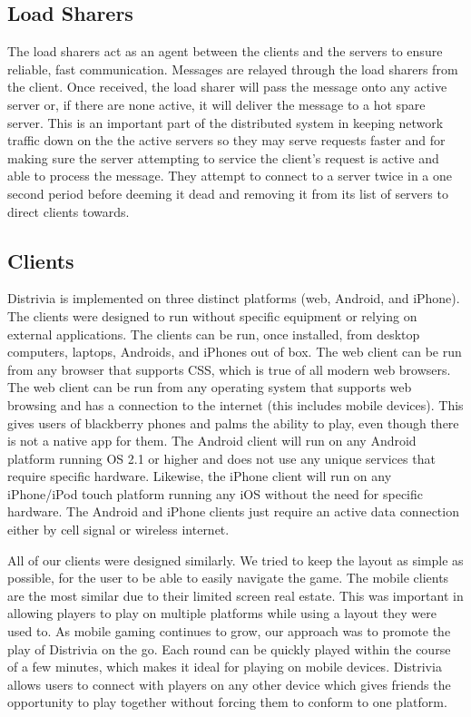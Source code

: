 \documentclass{dependencies/acm_proc_article-sp}
\begin{document}
\subsection{Load Sharers}
The load sharers act as an agent between the clients and the servers to ensure reliable, fast communication.
Messages are relayed through the load sharers from the client.
Once received, the load sharer will pass the message onto any active server or, if there are none active, it will deliver the message to a hot spare server.
This is an important part of the distributed system in keeping network traffic down on the the active servers so they may serve requests faster and for making sure the server attempting to service the client's request is active and able to process the message.
They attempt to connect to a server twice in a one second period before deeming it dead and removing it from its list of servers to direct clients towards.


\subsection{Clients}
Distrivia is implemented on three distinct platforms (web, Android, and iPhone).
The clients were designed to run without specific equipment or relying on external applications. 
The clients can be run, once installed, from desktop computers, laptops, Androids, and iPhones out of box.
The web client can be run from any browser that supports CSS, which is true of all modern web browsers.
The web client can be run from any operating system that supports web browsing and has a connection to the internet (this includes mobile devices). 
This gives users of blackberry phones and palms the ability to play, even though there is not a native app for them.
The Android client will run on any Android platform running OS 2.1 or higher and does not use any unique services that require specific hardware.
Likewise, the iPhone client will run on any iPhone/iPod touch platform running any iOS without the need for specific hardware.
The Android and iPhone clients just require an active data connection either by cell signal or wireless internet.

All of our clients were designed similarly.
We tried to keep the layout as simple as possible, for the user to be able to easily navigate the game.
The mobile clients are the most similar due to their limited screen real estate.
This was important in allowing players to play on multiple platforms while using a layout they were used to.
As mobile gaming continues to grow, our approach was to promote the play of Distrivia on the go. 
Each round can be quickly played within the course of a few minutes, which makes it ideal for playing on mobile devices.
Distrivia allows users to connect with players on any other device which gives friends the opportunity to play together without forcing them to conform to one platform.
\end{document}
